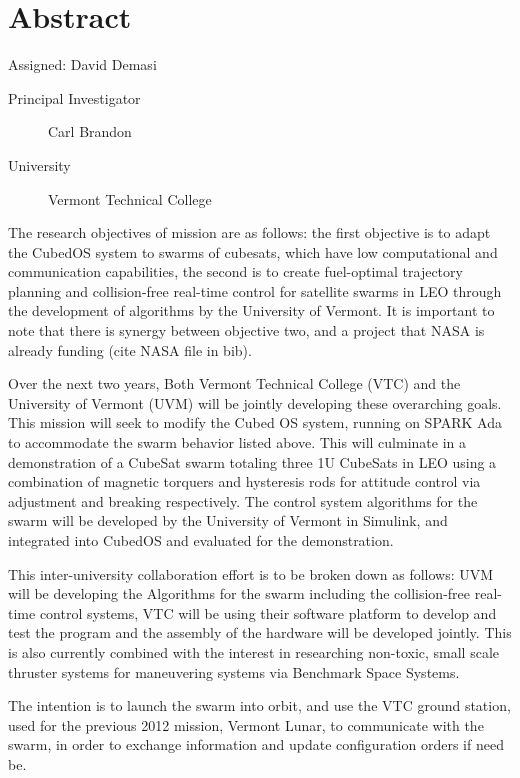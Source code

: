 \section{Abstract}
Assigned: David Demasi \cite{brandon:2008}

\begin{description}
\item[Principal Investigator] Carl Brandon
\item[University] Vermont Technical College
\end{description}

The research objectives of mission are as follows:  the first objective is to adapt the CubedOS system to swarms of cubesats, which have low computational and communication capabilities, the second is to create fuel-optimal trajectory planning and collision-free real-time control for satellite swarms in LEO through the development of algorithms by the University of Vermont. It is important to note that there is synergy between objective two, and a project that NASA is already funding (cite NASA file in bib).

Over the next two years, Both Vermont Technical College (VTC) and the University of Vermont (UVM) will be jointly developing these overarching goals. This mission will seek to modify the Cubed OS system, running on SPARK Ada to accommodate the swarm behavior listed above. This will culminate in a demonstration of a CubeSat swarm totaling three 1U CubeSats in LEO using a combination of magnetic torquers and hysteresis rods for attitude control via adjustment and breaking respectively. The control system algorithms for the swarm will be developed by the University of Vermont in Simulink, and integrated into CubedOS and evaluated for the demonstration.

This inter-university collaboration effort is to be broken down as follows: UVM will be developing the Algorithms for the swarm including the collision-free real-time control systems, VTC will be using their software platform to develop and test the program and the assembly of the hardware will be developed jointly. This is also currently combined with the interest in researching non-toxic, small scale thruster systems for maneuvering systems via Benchmark Space Systems.

The intention is to launch the swarm into orbit, and use the VTC ground station, used for the previous 2012 mission, Vermont Lunar, to communicate with the swarm, in order to exchange information and update configuration orders if need be. 
	

